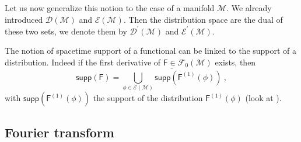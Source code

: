 \documentclass[10pt]{book}
\newcommand{\supp}{\mathsf{supp}}
\newcommand{\Dcal}{\mathcal{D}}
\newcommand{\Ecal}{\mathcal{E}}
\newcommand{\Fcal}{\mathcal{F}}
\newcommand{\Mcal}{\mathcal{M}}
\newcommand{\Fsf}{\mathsf{F}}
\theoremstyle{break}
\begin{document}
\bigskip


Let us now generalize this notion to the case of a manifold $\Mcal$. We already introduced $\Dcal(\Mcal)$ and $\Ecal(\Mcal)$. Then the distribution space are the dual of these two sets, we denote them by $\Dcal^\prime(\Mcal)$ and $\Ecal^\prime(\Mcal)$.


\bigskip


The notion of spacetime support of a functional can be linked to the support of a distribution. Indeed if the first derivative of $\Fsf\in\Fcal_0(\Mcal)$ exists, then
%
\begin{equation*}
\supp\left(\Fsf\right) = \overline{\bigcup_{\phi\in\Ecal(\Mcal)} \supp\left(\Fsf^{(1)}(\phi)\right)} \ ,
\end{equation*}
%
with $\supp\left(\Fsf^{(1)}(\phi)\right)$ the support of the distribution $\Fsf^{(1)}(\phi)$ (look at \cite{brunetti_algebraic_2012}).


\subsection{Fourier transform}
\end{document}
